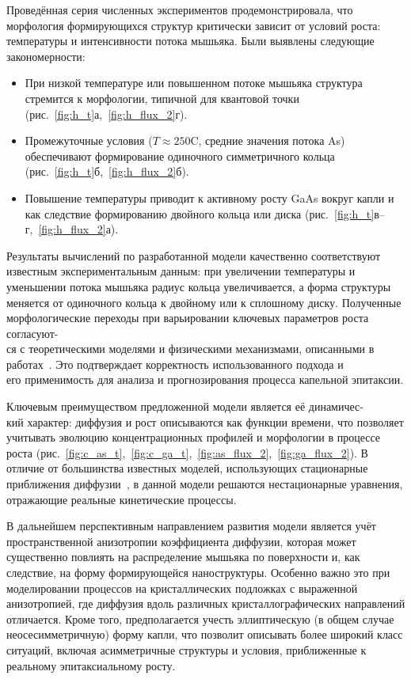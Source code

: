 \documentclass[14pt,oneside]{extarticle}
\begin{document}
Проведённая серия численных экспериментов продемонстрировала, что\\ 
морфология формирующихся структур критически зависит от условий роста: температуры и интенсивности потока мышьяка. Были выявлены следующие закономерности:

\begin{itemize}
    \item При низкой температуре или повышенном потоке мышьяка структура стремится к морфологии, типичной для квантовой точки (рис.~\ref{fig:h_t}а,~\ref{fig:h_flux_2}г).
    \item Промежуточные условия ($T \approx 250$\textdegree C, средние значения потока As) обеспечивают формирование одиночного симметричного кольца (рис.~\ref{fig:h_t}б,~\ref{fig:h_flux_2}б).
    \item Повышение температуры приводит к активному росту GaAs вокруг капли и как следствие формированию двойного кольца или диска (рис.~\ref{fig:h_t}в–г,~\ref{fig:h_flux_2}а).
\end{itemize}

Результаты вычислений по разработанной модели качественно соответствуют известным экспериментальным данным: при увеличении температуры и уменьшении потока мышьяка радиус кольца увеличивается, а форма структуры меняется от одиночного кольца к двойному или к сплошному диску. Полученные морфологические переходы при варьировании ключевых параметров роста согласуют-
\\ся с теоретическими моделями и физическими механизмами, описанными в работах~\cite{zhou2013,mano2005nano,fan2023evaporation}. Это подтверждает корректность использованного подхода и \\
его применимость для анализа и прогнозирования процесса капельной эпитаксии.

Ключевым преимуществом предложенной модели является её динамичес-\\
кий характер: диффузия и рост описываются как функции времени, что позволяет учитывать эволюцию концентрационных профилей и морфологии в процессе роста (рис.~\ref{fig:c_as_t},~\ref{fig:c_ga_t},~\ref{fig:as_flux_2},~\ref{fig:ga_flux_2}). В отличие от большинства известных моделей, использующих стационарные приближения диффузии~\cite{zhou2013}, в данной модели решаются нестационарные уравнения, отражающие реальные кинетические процессы.

В дальнейшем перспективным направлением развития модели является учёт пространственной анизотропии коэффициента диффузии, которая может существенно повлиять на распределение мышьяка по поверхности и, как следствие, на форму формирующейся наноструктуры. Особенно важно это при моделировании процессов на кристаллических подложках с выраженной анизотропией, где диффузия вдоль различных кристаллографических направлений отличается. Кроме того, предполагается учесть эллиптическую (в общем случае неосесимметричную) форму капли, что позволит описывать более широкий класс ситуаций, включая асимметричные структуры и условия, приближенные к реальному эпитаксиальному росту.
\end{document}
